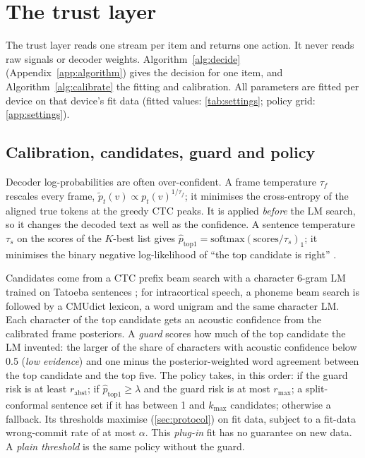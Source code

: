 \section{The trust layer}
\label{sec:trust}

The trust layer reads one stream per item and returns one action. It never reads raw signals or decoder weights. Algorithm~\ref{alg:decide} (Appendix~\ref{app:algorithm}) gives the decision for one item, and Algorithm~\ref{alg:calibrate} the fitting and calibration. All parameters are fitted per device on that device's fit data (fitted values: \cref{tab:settings}; policy grid: \cref{app:settings}).

\subsection{Calibration, candidates, guard and policy}
\label{sec:policy}
Decoder log-probabilities are often over-confident. A frame temperature $\tau_f$ rescales every frame, $\tilde p_t(v) \propto p_t(v)^{1/\tau_f}$; it minimises the cross-entropy of the aligned true tokens at the greedy CTC peaks. It is applied \emph{before} the LM search, so it changes the decoded text as well as the confidence. A sentence temperature $\tau_s$ on the scores of the $K$-best list gives $\hat p_{\mathrm{top1}} = \mathrm{softmax}(\text{scores}/\tau_s)_1$; it minimises the binary negative log-likelihood of ``the top candidate is right'' \citep{guo2017calibration}.

Candidates come from a CTC prefix beam search with a character 6-gram LM trained on Tatoeba sentences \citep{graves2006ctc,hannun2014deepspeech}; for intracortical speech, a phoneme beam search is followed by a CMUdict lexicon, a word unigram and the same character LM. Each character of the top candidate gets an acoustic confidence from the calibrated frame posteriors. A \emph{guard} scores how much of the top candidate the LM invented: the larger of the share of characters with acoustic confidence below 0.5 (\emph{low evidence}) and one minus the posterior-weighted word agreement between the top candidate and the top five. The policy takes, in this order:  if the guard risk is at least $r_{\mathrm{abst}}$;  if $\hat p_{\mathrm{top1}} \ge \lambda$ and the guard risk is at most $r_{\mathrm{max}}$;  a split-conformal sentence set if it has between 1 and $k_{\max}$ candidates; otherwise a fallback. Its thresholds maximise \ewpm{} (\cref{sec:protocol}) on fit data, subject to a fit-data wrong-commit rate of at most $\alpha$. This \emph{plug-in} fit has no guarantee on new data. A \emph{plain threshold} is the same policy without the guard.


